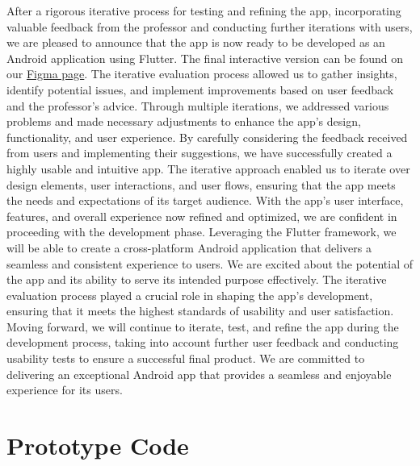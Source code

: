 \documentclass{article}
\begin{document}
After a rigorous iterative process for testing and refining the app, incorporating valuable feedback from the professor and conducting further iterations with users, we are pleased to announce that the app is now ready to be developed as an Android application using Flutter. The final interactive version can be found on our \href{https://www.figma.com/proto/GW9r1dxiVf3SlhVVwJSsJm/UniDrive?node-id=202-4254&starting-point-node-id=202%3A4195}{Figma page}.
The iterative evaluation process allowed us to gather insights, identify potential issues, and implement improvements based on user feedback and the professor's advice. Through multiple iterations, we addressed various problems and made necessary adjustments to enhance the app's design, functionality, and user experience.
By carefully considering the feedback received from users and implementing their suggestions, we have successfully created a highly usable and intuitive app. The iterative approach enabled us to iterate over design elements, user interactions, and user flows, ensuring that the app meets the needs and expectations of its target audience. With the app's user interface, features, and overall experience now refined and optimized, we are confident in proceeding with the development phase. Leveraging the Flutter framework, we will be able to create a cross-platform Android application that delivers a seamless and consistent experience to users. We are excited about the potential of the app and its ability to serve its intended purpose effectively. The iterative evaluation process played a crucial role in shaping the app's development, ensuring that it meets the highest standards of usability and user satisfaction. Moving forward, we will continue to iterate, test, and refine the app during the development process, taking into account further user feedback and conducting usability tests to ensure a successful final product. We are committed to delivering an exceptional Android app that provides a seamless and enjoyable experience for its users.
\newpage

\section{Prototype Code}
\newpage 
\end{document}
